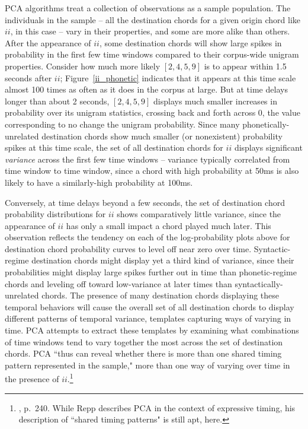 PCA algorithms treat a collection of observations as a sample population.  The individuals in the sample -- all the destination chords for a given origin chord like $ii$, in this case -- vary in their properties, and some are more alike than others.  After the appearance of $ii$, some destination chords will show large spikes in probability in the first few time windows compared to their corpus-wide unigram properties.  Consider how much more likely $[2,4,5,9]$ is to appear within 1.5 seconds after $ii$; Figure~\ref{ii_phonetic} indicates that it appears at this time scale almost 100 times as often as it does in the corpus at large.  But at time delays longer than about 2 seconds, $[2,4,5,9]$ displays much smaller increases in probability over its unigram statistics, crossing back and forth across 0, the value corresponding to no change the unigram probability.  Since many phonetically-unrelated destination chords show much smaller (or nonexistent) probability spikes at this time scale, the set of all destination chords for $ii$ displays significant \emph{variance} across the first few time windows -- variance typically correlated from time window to time window, since a chord with high probability at 50ms is also likely to have a similarly-high probability at 100ms.

Conversely, at time delays beyond a few seconds, the set of destination chord probability distributions for $ii$ shows comparatively little variance, since the appearance of $ii$ has only a small impact a chord played much later.  This observation reflects the tendency on each of the log-probability plots above for destination chord probability curves to level off near zero over time.  Syntactic-regime destination chords might display yet a third kind of variance, since their probabilities might display large spikes further out in time than phonetic-regime chords and leveling off toward low-variance at later times than syntactically-unrelated chords.  The presence of many destination chords displaying these temporal behaviors will cause the overall set of all destination chords to display different patterns of temporal variance, templates capturing ways of varying in time.  PCA attempts to extract these templates by examining what combinations of time windows tend to vary together the most across the set of destination chords.  PCA ``thus can reveal whether there is more than one shared timing pattern represented in the sample," more than one way of varying over time in the presence of $ii$.\footnote{\cite{repp1992}, p.\ 240.  While Repp describes PCA in the context of expressive timing, his description of ``shared timing patterns" is still apt, here.}

